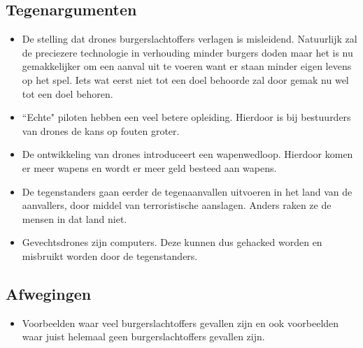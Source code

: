\subsection{Tegenargumenten}
\begin{itemize}
\item
De stelling dat drones burgerslachtoffers verlagen is misleidend. Natuurlijk zal de preciezere technologie in verhouding minder burgers doden maar het is nu gemakkelijker om een aanval uit te voeren want er staan minder eigen levens op het spel. Iets wat eerst niet tot een doel behoorde zal door gemak nu wel tot een doel behoren.


\item
``Echte" piloten hebben een veel betere opleiding. Hierdoor is bij bestuurders van drones de kans op fouten groter.

\item
De ontwikkeling van drones introduceert een wapenwedloop. Hierdoor komen er meer wapens en wordt er meer geld besteed aan wapens.


\item
De tegenstanders gaan eerder de tegenaanvallen uitvoeren in het land van de aanvallers, door middel van terroristische aanslagen. Anders raken ze de mensen in dat land niet.

\item
Gevechtsdrones zijn computers. Deze kunnen dus gehacked worden en misbruikt worden door de tegenstanders.

\end{itemize}

\subsection{Afwegingen}

\begin{itemize}
\item
Voorbeelden waar veel burgerslachtoffers gevallen zijn en ook voorbeelden waar juist helemaal geen burgerslachtoffers gevallen zijn.
\end{itemize}

